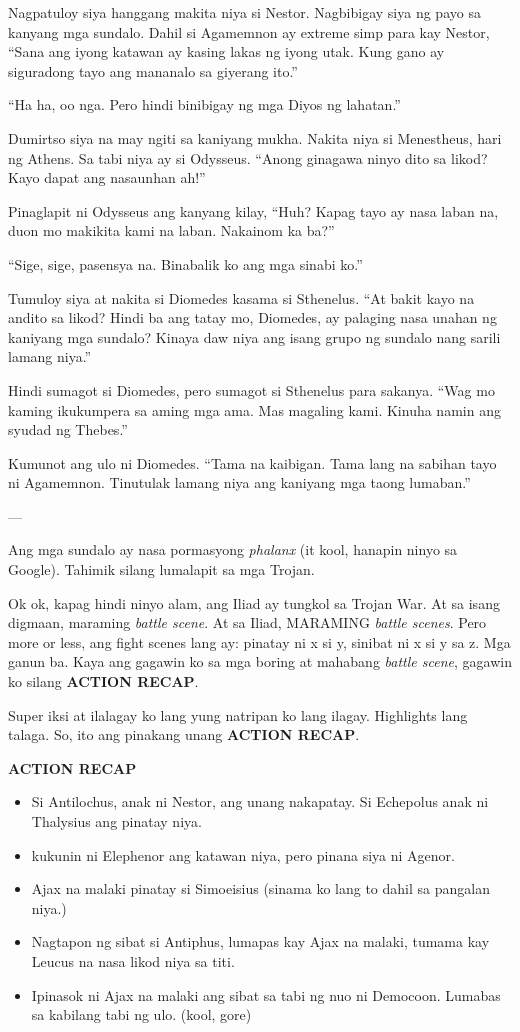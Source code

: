 \documentclass[12pt,letterpaper]{report}
\newenvironment{recap}{\begin{samepage}\begin{center}{\large\textbf{ACTION RECAP}}\begin{itemize}}{\end{itemize}\end{center}\end{samepage}}
\begin{document}
Nagpatuloy siya hanggang makita niya si Nestor. Nagbibigay siya ng payo sa kanyang mga sundalo. Dahil si Agamemnon ay extreme simp para kay Nestor, ``Sana ang iyong katawan ay kasing lakas ng iyong utak. Kung gano ay siguradong tayo ang mananalo sa giyerang ito.''

``Ha ha, oo nga. Pero hindi binibigay ng mga Diyos ng lahatan.''

Dumirtso siya na may ngiti sa kaniyang mukha. Nakita niya si Menestheus, hari ng Athens. Sa tabi niya ay si Odysseus. ``Anong ginagawa ninyo dito sa likod? Kayo dapat ang nasaunhan ah!''

Pinaglapit ni Odysseus ang kanyang kilay, ``Huh? Kapag tayo ay nasa laban na, duon mo makikita kami na laban. Nakainom ka ba?''

``Sige, sige, pasensya na. Binabalik ko ang mga sinabi ko.''

Tumuloy siya at nakita si Diomedes kasama si Sthenelus. ``At bakit kayo na andito sa likod? Hindi ba ang tatay mo, Diomedes, ay palaging nasa unahan ng kaniyang mga sundalo? Kinaya daw niya ang isang grupo ng sundalo nang sarili lamang niya.''

Hindi sumagot si Diomedes, pero sumagot si Sthenelus para sakanya. ``Wag mo kaming ikukumpera sa aming mga ama. Mas magaling kami. Kinuha namin ang syudad ng Thebes.''

Kumunot ang ulo ni Diomedes. ``Tama na kaibigan. Tama lang na sabihan tayo ni Agamemnon. Tinutulak lamang niya ang kaniyang mga taong lumaban.''

---

Ang mga sundalo ay nasa pormasyong \textit{phalanx} (it kool, hanapin ninyo sa Google). Tahimik silang lumalapit sa mga Trojan.

Ok ok, kapag hindi ninyo alam, ang Iliad ay tungkol sa Trojan War. At sa isang digmaan, maraming \textit{battle scene}. At sa Iliad, MARAMING \textit{battle scenes}. Pero more or less, ang fight scenes lang ay: pinatay ni x si y, sinibat ni x si y sa z. Mga ganun ba. Kaya ang gagawin ko sa mga boring at mahabang \textit{battle scene}, gagawin ko silang \textbf{ACTION RECAP}.

Super iksi at ilalagay ko lang yung natripan ko lang ilagay. Highlights lang talaga. So, ito ang pinakang unang \textbf{ACTION RECAP}.

\begin{recap}
    \item Si Antilochus, anak ni Nestor, ang unang nakapatay. Si Echepolus anak ni Thalysius ang pinatay niya.
    \item kukunin ni Elephenor ang katawan niya, pero pinana siya ni Agenor.
    \item Ajax na malaki pinatay si Simoeisius (sinama ko lang to dahil sa pangalan niya.)
    \item Nagtapon ng sibat si Antiphus, lumapas kay Ajax na malaki, tumama kay Leucus na nasa likod niya sa titi.
    \item Ipinasok ni Ajax na malaki ang sibat sa tabi ng nuo ni Democoon. Lumabas sa kabilang tabi ng ulo. (kool, gore)
\end{recap}
\end{document}
